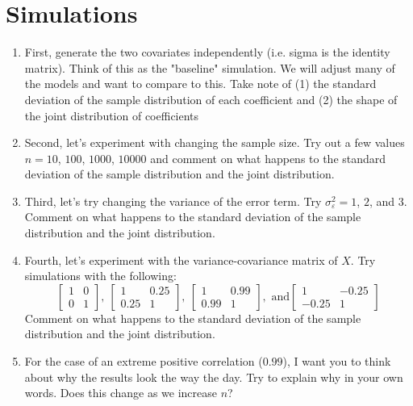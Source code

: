 \documentclass[12pt]{article}
\begin{document}
\section*{Simulations}
\begin{enumerate}
  \item First, generate the two covariates independently (i.e. sigma is the identity matrix). Think of this as the "baseline" simulation. We will adjust many of the models and want to compare to this. Take note of (1) the standard deviation of the sample distribution of each coefficient and (2) the shape of the joint distribution of coefficients
  
  \item Second, let's experiment with changing the sample size. Try out a few values $n = 10$, $100$, $1000$, $10000$ and comment on what happens to the standard deviation of the sample distribution and the joint distribution.
  
  \item Third, let's try changing the variance of the error term. Try $\sigma_{\varepsilon}^2 = 1$, $2$, and $3$. 
  Comment on what happens to the standard deviation of the sample distribution and the joint distribution. 

  \item Fourth, let's experiment with the variance-covariance matrix of $X$. Try simulations with the following:
  $$
    \begin{bmatrix}1 & 0 \\ 0 & 1\end{bmatrix},
    \  
    \begin{bmatrix}1 & 0.25 \\ 0.25 & 1\end{bmatrix},
    \ 
    \begin{bmatrix}1 & 0.99 \\ 0.99 & 1\end{bmatrix},
    \text{ and} \begin{bmatrix}1 & -0.25 \\ -0.25 & 1\end{bmatrix}
  $$
  Comment on what happens to the standard deviation of the sample distribution and the joint distribution. 

  \item For the case of an extreme positive correlation ($0.99$), I want you to think about why the results look the way the day. Try to explain why in your own words. Does this change as we increase $n$? 

  


\end{enumerate}
\end{document}
